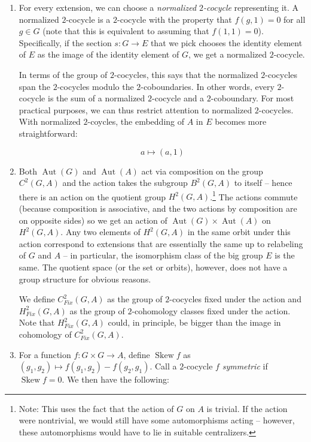 \documentclass[10pt]{amsart}
\newcommand{\Skew}{\operatorname{Skew}}
\newcommand{\Aut}{\operatorname{Aut}}
\begin{document}
\begin{enumerate}
\item For every extension, we can choose a {\em normalized
  $2$-cocycle} representing it. A normalized $2$-cocycle is a
  $2$-cocycle with the property that $f(g,1) = 0$ for all $g \in G$
  (note that this is equivalent to assuming that $f(1,1) =
  0$). Specifically, if the section $s:G \to E$ that we pick chooses
  the identity element of $E$ as the image of the identity element of
  $G$, we get a normalized $2$-cocycle.

  In terms of the group of $2$-cocycles, this says that the normalized
  $2$-cocycles span the $2$-cocycles modulo the $2$-coboundaries. In
  other words, every $2$-cocycle is the sum of a normalized
  $2$-cocycle and a $2$-coboundary. For most practical purposes, we
  can thus restrict attention to normalized $2$-cocycles. With
  normalized $2$-coycles, the embedding of $A$ in $E$ becomes more
  straightforward:

  $$a \mapsto (a,1)$$

\item Both $\Aut(G)$ and $\Aut(A)$ act via composition on the group
  $C^2(G,A)$ and the action takes the subgroup $B^2(G,A)$ to itself --
  hence there is an action on the quotient group
  $H^2(G,A)$.\footnote{Note: This uses the fact that the action of $G$
  on $A$ is trivial. If the action were nontrivial, we would still
  have some automorphisms acting -- however, these automorphisms would
  have to lie in suitable centralizers.} The actions commute (because
  composition is associative, and the two actions by composition are
  on opposite sides) so we get an action of $\Aut(G) \times \Aut(A)$
  on $H^2(G,A)$. Any two elements of $H^2(G,A)$ in the same orbit
  under this action correspond to extensions that are essentially the
  same up to relabeling of $G$ and $A$ -- in particular, the
  isomorphism class of the big group $E$ is the same. The quotient
  space (or the set or orbits), however, does not have a group
  structure for obvious reasons.

  We define $C^2_{Fix}(G,A)$ as the group of $2$-cocycles fixed under
  the action and $H^2_{Fix}(G,A)$ as the group of $2$-cohomology
  classes fixed under the action. Note that $H^2_{Fix}(G,A)$ could, in
  principle, be bigger than the image in cohomology of
  $C^2_{Fix}(G,A)$.

\item For a function $f:G \times G \to A$, define $\Skew f$ as
  $(g_1,g_2) \mapsto f(g_1,g_2) - f(g_2,g_1)$. Call a $2$-cocycle $f$
  {\em symmetric} if $\Skew f = 0$. We then have the following:


\end{enumerate}
\end{document}
